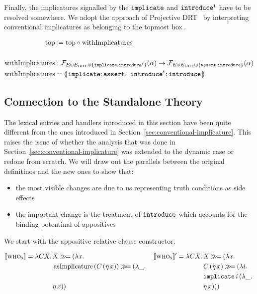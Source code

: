 Finally, the implicatures signalled by the $\mathtt{implicate}$ and
$\mathtt{introduce^i}$ have to be resolved somewhere. We adopt the approach of
Projective DRT~\cite{venhuizen2013parsimonious} by interpreting
conventional implicatures as belonging to the topmost $\mathrm{box}$.

\begin{align*}
  \TOP &\coloneqq \TOP \circ \withImplicatures \\
  \\
  \withImplicatures &: \FF_{E \uplus E_\DRT \uplus \{\op{implicate},\op{introduce^i}\}}(\alpha) \to
                       \FF_{E \uplus E_\DRT \uplus \{\op{assert},\op{introduce}\}}(\alpha) \\
  \withImplicatures &= \banana{\onto{\op{implicate}}{\op{assert}},\
                               \onto{\op{introduce^i}}{\op{introduce}}}
\end{align*}


\subsection{Connection to the Standalone Theory}

The lexical entries and handlers introduced in this section have been
quite different from the ones introduced in
Section~\ref{sec:conventional-implicature}. This raises the issue of
whether the analysis that was done in
Section~\ref{sec:conventional-implicature} was extended to the dynamic case
or redone from scratch. We will draw out the parallels between the
original definitinos and the new ones to show that:

\begin{itemize}
\item the most visible changes are due to us representing truth conditions
  as side effects
\item the important change is the treatment of $\mathtt{introduce}$ which
  accounts for the binding potentinal of appositives
\end{itemize}

We start with the appositive relative clause constructor.

\begin{align*}
  \llbracket \textsc{who}_{\textsc{s}} \rrbracket = \lambda C X.\, 
      &X \mathbin{\gg\!=} (\lambda x.\, 
 &\llbracket \textsc{who}_{\textsc{s}} \rrbracket' = \lambda C X.\, 
      &X \mathbin{\gg\!=} (\lambda x.\,  \\
      &\operatorname{asImplicature}\,(C\,(\eta\,x)) \mathbin{\gg\!=} (\lambda \_.\, 
     &&C\,(\eta\,x) \mathbin{\gg\!=} (\lambda i.\,  \\
      &
     &&\mathtt{implicate}\,i\,(\lambda \_.\,  \\
      &\eta\,x))
     &&\eta\,x)))
\end{align*}

